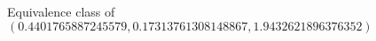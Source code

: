 \documentclass[preview]{standalone}
\begin{document}
\begin{center}
Equivalence class of $(0.4401765887245579, 0.17313761308148867, 1.9432621896376352)$
\end{center}
\end{document}
